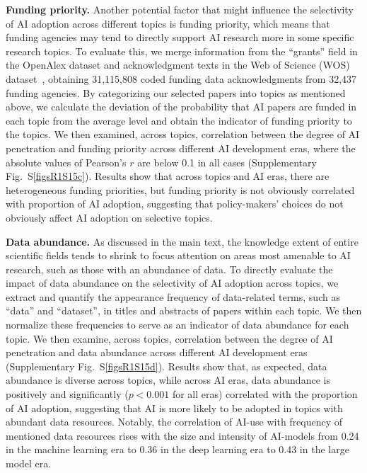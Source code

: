 \textbf{Funding priority.} Another potential factor that might influence the selectivity of AI adoption across different topics is funding priority, which means that funding agencies may tend to directly support AI research more in some specific research topics.
To evaluate this, we merge information from the “grants” field in the OpenAlex dataset and acknowledgment texts in the Web of Science (WOS) dataset~\supercite{WoS,mongeon2016journal}, obtaining 31,115,808 coded funding data acknowledgments from 32,437 funding agencies.
By categorizing our selected papers into topics as mentioned above, we calculate the deviation of the probability that AI papers are funded in each topic from the average level and obtain the indicator of funding priority to the topics.
We then examined, across topics, correlation between the degree of AI penetration and funding priority across different AI development eras, where the absolute values of Pearson’s $r$ are below 0.1 in all cases (Supplementary Fig.~S\ref{figsR1S15c}).
Results show that across topics and AI eras, there are heterogeneous funding priorities, but funding priority is not obviously correlated with proportion of AI adoption, suggesting that policy-makers’ choices do not obviously affect AI adoption on selective topics.

\textbf{Data abundance.} As discussed in the main text, the knowledge extent of entire scientific fields tends to shrink to focus attention on areas most amenable to AI research, such as those with an abundance of data.
To directly evaluate the impact of data abundance on the selectivity of AI adoption across topics, we extract and quantify the appearance frequency of data-related terms, such as “data” and “dataset”, in titles and abstracts of papers within each topic.
We then normalize these frequencies to serve as an indicator of data abundance for each topic.
We then examine, across topics, correlation between the degree of AI penetration and data abundance across different AI development eras (Supplementary Fig.~S\ref{figsR1S15d}).
Results show that, as expected, data abundance is diverse across topics, while across AI eras, data abundance is positively and significantly ($p<0.001$ for all eras) correlated with the proportion of AI adoption, suggesting that AI is more likely to be adopted in topics with abundant data resources. Notably, the correlation of AI-use with frequency of mentioned data resources rises with the size and intensity of AI-models from 0.24 in the machine learning era to 0.36 in the deep learning era to 0.43 in the large model era. 

